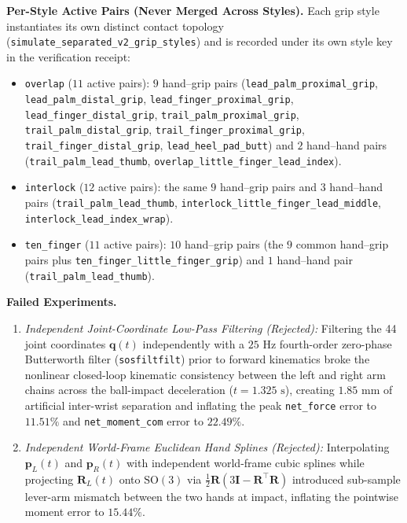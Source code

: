 \documentclass[11pt,a4paper]{article}
\begin{document}
\textbf{Per-Style Active Pairs (Never Merged Across Styles).} Each grip style instantiates its own distinct contact topology (\texttt{simulate\_separated\_v2\_grip\_styles}) and is recorded under its own style key in the verification receipt:
\begin{itemize}[leftmargin=*,noitemsep]
\item \texttt{overlap} ($11$ active pairs): $9$ hand--grip pairs (\texttt{lead\_palm\_proximal\_grip}, \texttt{lead\_palm\_distal\_grip}, \texttt{lead\_finger\_proximal\_grip}, \texttt{lead\_finger\_distal\_grip}, \texttt{trail\_palm\_proximal\_grip}, \texttt{trail\_palm\_distal\_grip}, \texttt{trail\_finger\_proximal\_grip}, \texttt{trail\_finger\_distal\_grip}, \texttt{lead\_heel\_pad\_butt}) and $2$ hand--hand pairs (\texttt{trail\_palm\_lead\_thumb}, \texttt{overlap\_little\_finger\_lead\_index}).
\item \texttt{interlock} ($12$ active pairs): the same $9$ hand--grip pairs and $3$ hand--hand pairs (\texttt{trail\_palm\_lead\_thumb}, \texttt{interlock\_little\_finger\_lead\_middle}, \texttt{interlock\_lead\_index\_wrap}).
\item \texttt{ten\_finger} ($11$ active pairs): $10$ hand--grip pairs (the $9$ common hand--grip pairs plus \texttt{ten\_finger\_little\_finger\_grip}) and $1$ hand--hand pair (\texttt{trail\_palm\_lead\_thumb}).
\end{itemize}

\textbf{Failed Experiments.}
\begin{enumerate}[leftmargin=*,noitemsep]
\item \emph{Independent Joint-Coordinate Low-Pass Filtering (Rejected):} Filtering the 44 joint coordinates $\mathbf{q}(t)$ independently with a $25\text{ Hz}$ fourth-order zero-phase Butterworth filter (\texttt{sosfiltfilt}) prior to forward kinematics broke the nonlinear closed-loop kinematic consistency between the left and right arm chains across the ball-impact deceleration ($t = 1.325\text{ s}$), creating $1.85\text{ mm}$ of artificial inter-wrist separation and inflating the peak \texttt{net\_force} error to $11.51\%$ and \texttt{net\_moment\_com} error to $22.49\%$.
\item \emph{Independent World-Frame Euclidean Hand Splines (Rejected):} Interpolating $\mathbf{p}_L(t)$ and $\mathbf{p}_R(t)$ with independent world-frame cubic splines while projecting $\mathbf{R}_L(t)$ onto $\mathrm{SO}(3)$ via $\tfrac{1}{2}\mathbf{R}(3\mathbf{I} - \mathbf{R}^\top\mathbf{R})$ introduced sub-sample lever-arm mismatch between the two hands at impact, inflating the pointwise moment error to $15.44\%$.
\end{enumerate}
\end{document}
